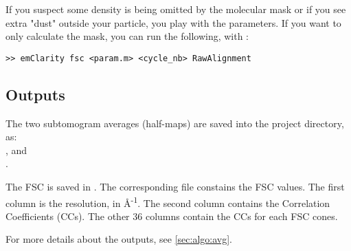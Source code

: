 If you suspect some density is being omitted by the molecular mask or if you see extra "dust" outside your particle, you play with the  parameters. If you want to only calculate the mask, you can run the following, with :
\begin{lstlisting}
>> emClarity fsc <param.m> <cycle_nb> RawAlignment
\end{lstlisting}

\subsection{Outputs}

The two subtomogram averages (half-maps) are saved into the project directory, as:\\ , and\\ .

The FSC is saved in . The corresponding  file constains the FSC values. The first column is the resolution, in \si{\angstrom}\textsuperscript{-1}. The second column contains the Correlation Coefficients (CCs). The other 36 columns contain the CCs for each FSC cones.

For more details about the outputs, see \ref{sec:algo:avg}.